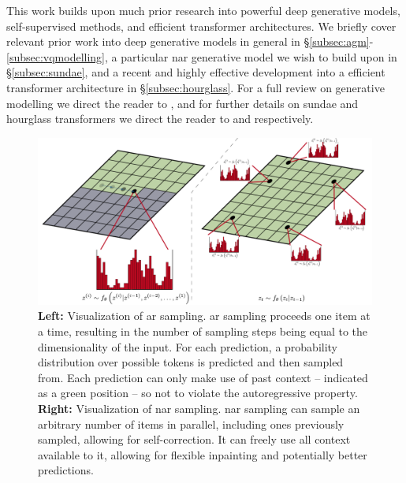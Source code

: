 
This work builds upon much prior research into powerful deep generative
models, self-supervised methods, and efficient
transformer architectures. We briefly cover relevant prior work into deep
generative models in general in \S\ref{subsec:agm}-\ref{subsec:vqmodelling}, a
particular \acrshort{nar} generative model we wish to build upon in
\S\ref{subsec:sundae}, and a recent and highly effective development into a
efficient transformer architecture in \S\ref{subsec:hourglass}. For a full
review on generative modelling we direct the reader to
\citet{bondtaylor2021review}, and for further details on \gls{sundae} and
hourglass transformers we direct the reader to \citet{savinov2022stepunrolled}
and \citet{nawrot2021hierarchical} respectively.

\begin{figure}[ht!]
    \centering
    \includegraphics[width=\textwidth]{figures/AR-NAR.pdf}
    \caption{
        \textbf{Left:} Visualization of \acrfull{ar} sampling. \gls{ar} sampling
        proceeds one item at a time, resulting in the number of sampling steps
        being equal to the dimensionality of the input. For each prediction, a
        probability distribution over possible tokens is predicted and then
        sampled from. Each prediction can only make use of past context --
        indicated as a green position -- so not to violate the autoregressive
        property.
        \textbf{Right:} Visualization of \acrfull{nar} sampling. \gls{nar}
        sampling can sample an arbitrary number of items in parallel, including
        ones previously sampled, allowing for self-correction. It can freely use
        all context available to it, allowing for flexible inpainting and
        potentially better predictions.
    }
\end{figure}

